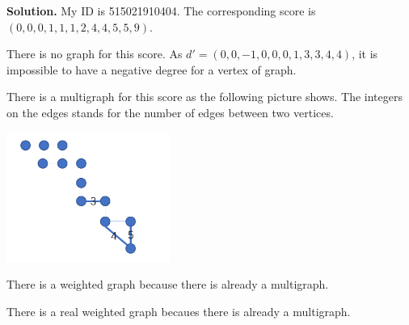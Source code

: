 

\textbf{Solution.}
My ID is 515021910404. The corresponding score is $(0,0,0,1,1,1,2,4,4,5,5,9)$.
\par There is no graph for this score. As $d'=(0,0,-1,0,0,0,1,3,3,4,4)$, it is impossible to have a negative degree for a vertex of graph.
\par There is a multigraph for this score as the following picture shows. The integers on the edges stands for the number of edges between two vertices.

\begin{center}
	\includegraphics[width=0.4\textwidth]{lfb1.png}
\end{center}
\par There is a weighted graph because there is already a multigraph.
\par There is a real weighted graph becaues there is already a multigraph.